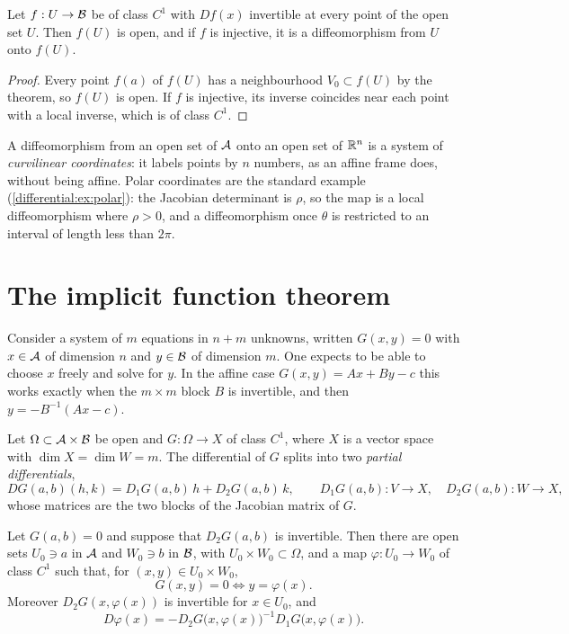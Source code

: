 \begin{notechapter}
\begin{corollary}\label{inverse-implicit:cor:open}
Let $f:U\to\mathcal{B}$ be of class $C^1$ with $Df(x)$ invertible at every point
of the open set $U$. Then $f(U)$ is open, and if $f$ is injective, it is a
diffeomorphism from $U$ onto $f(U)$.
\end{corollary}

\begin{proof}
Every point $f(a)$ of $f(U)$ has a neighbourhood $V_0\subset f(U)$ by the
theorem, so $f(U)$ is open. If $f$ is injective, its inverse coincides
near each point with a local inverse, which is of class $C^1$.
\end{proof}

A diffeomorphism from an open set of $\mathcal{A}$ onto an open set of $\mathbb{R}^n$ is
a system of \emph{curvilinear coordinates}: it labels points by $n$
numbers, as an affine frame does, without being affine. Polar coordinates
are the standard example (\cref{differential:ex:polar}): the Jacobian
determinant is $\rho$, so the map is a local diffeomorphism where
$\rho > 0$, and a diffeomorphism once $\theta$ is restricted to an
interval of length less than $2\pi$.

\section{The implicit function theorem}\label{inverse-implicit:sec:implicit}

Consider a system of $m$ equations in $n + m$ unknowns, written
$G(x, y) = 0$ with $x\in\mathcal{A}$ of dimension $n$ and $y\in\mathcal{B}$ of dimension
$m$. One expects to be able to choose $x$ freely and solve for $y$. In
the affine case $G(x, y) = Ax + By - c$ this works exactly when the
$m\times m$ block $B$ is invertible, and then
$y = -B^{-1}(Ax - c)$.

Let $\Omega\subset\mathcal{A}\times\mathcal{B}$ be open and $G:\Omega\to X$ of class
$C^1$, where $X$ is a vector space with $\dim X = \dim W = m$. The
differential of $G$ splits into two \emph{partial differentials},
\[
  DG(a, b)(h, k) = D_1G(a, b)\,h + D_2G(a, b)\,k ,
  \qquad D_1G(a, b):V\to X,\quad D_2G(a, b):W\to X ,
\]
whose matrices are the two blocks of the Jacobian matrix of $G$.

\begin{theorem}\label{inverse-implicit:thm:implicit}
Let $G(a, b) = 0$ and suppose that $D_2G(a, b)$ is invertible. Then there
are open sets $U_0\ni a$ in $\mathcal{A}$ and $W_0\ni b$ in $\mathcal{B}$, with
$U_0\times W_0\subset\Omega$, and a map $\varphi:U_0\to W_0$ of class
$C^1$ such that, for $(x, y)\in U_0\times W_0$,
\[
  G(x, y) = 0 \iff y = \varphi(x) .
\]
Moreover $D_2G(x, \varphi(x))$ is invertible for $x\in U_0$, and
\begin{equation}\label{inverse-implicit:eq:implicit}
  D\varphi(x) = -D_2G\bigl(x, \varphi(x)\bigr)^{-1}
  D_1G\bigl(x, \varphi(x)\bigr) .
\end{equation}
\end{theorem}


\end{notechapter}
